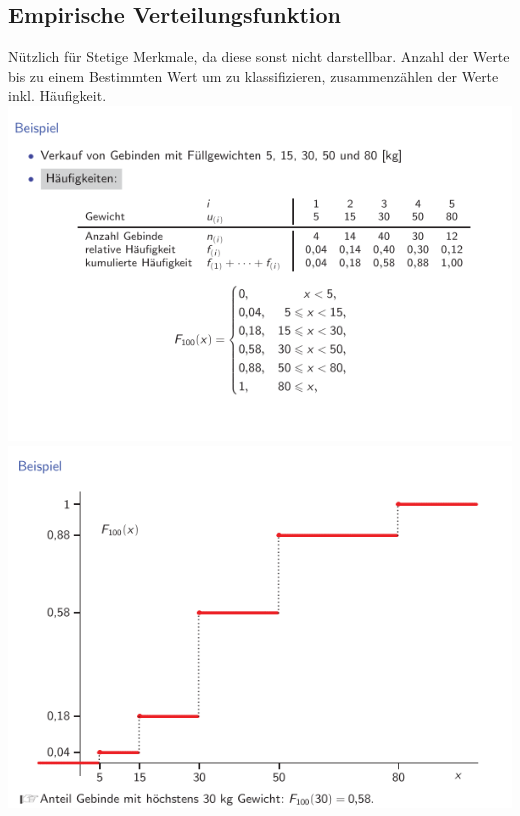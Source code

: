 \documentclass[10pt,a4paper]{article}
\begin{document}
	\subsection{Empirische Verteilungsfunktion}
	Nützlich für Stetige Merkmale, da diese sonst nicht darstellbar. Anzahl der Werte bis zu einem Bestimmten Wert um zu klassifizieren, zusammenzählen der Werte inkl. Häufigkeit.\\
	\includegraphics[scale=0.2]{verteilungsfkt.png}
	\includegraphics[scale=0.2]{verteilungsfkt2.png}
\end{document}
